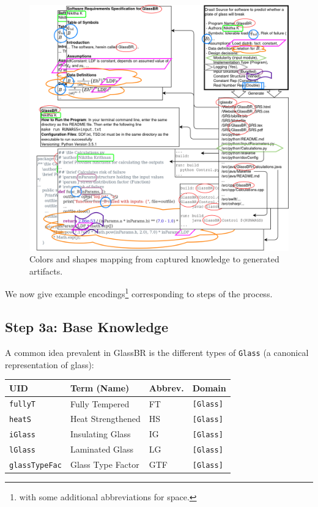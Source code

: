 \documentclass[sigconf,review,anonymous=false]{acmart}
\begin{document}
\begin{figure}[h]
  \centering
  \includegraphics[width=\linewidth]{assets/DrasilSupportsChange-right-portrait-overlapped-ungrouped-11ptFont-squished-noSmith-v1-300dpi.png}
  \caption{Colors and shapes mapping from captured knowledge to generated
  artifacts.}
  \label{Fig_DrasilAndChange}
\end{figure}

We now give example encodings\footnote{with some additional abbreviations 
for space.}
corresponding to steps of the process.
\subsection*{Step 3a: Base Knowledge}

A common idea prevalent in GlassBR is the different types 
of \texttt{Glass} (a canonical representation of glass):

\begin{center}
  \begin{tabular}{|l|l|l|l|}
    \hline
    \textbf{UID} & \textbf{Term (Name)} & \textbf{Abbrev.} & \textbf{Domain} \\ \hline
    \texttt{fullyT} & Fully Tempered & FT & \texttt{[Glass]} \\ \hline
    \texttt{heatS} & Heat Strengthened & HS & \texttt{[Glass]} \\ \hline
    \texttt{iGlass} & Insulating Glass & IG & \texttt{[Glass]} \\ \hline
    \texttt{lGlass} & Laminated Glass & LG & \texttt{[Glass]} \\ \hline
    \texttt{glassTypeFac} & Glass Type Factor & GTF & \texttt{[Glass]} \\ \hline
  \end{tabular}
\end{center}
\end{document}
